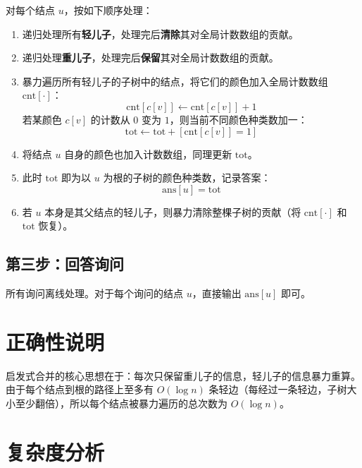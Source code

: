 \documentclass[11pt,a4paper,twocolumn]{ctexart}  %
\begin{document}
对每个结点 $u$，按如下顺序处理：

\begin{enumerate}
    \item 递归处理所有\textbf{轻儿子}，处理完后\textbf{清除}其对全局计数数组的贡献。
    \item 递归处理\textbf{重儿子}，处理完后\textbf{保留}其对全局计数数组的贡献。
    \item 暴力遍历所有轻儿子的子树中的结点，将它们的颜色加入全局计数数组 $\mathrm{cnt}[\cdot]$：
    \[
        \mathrm{cnt}[c[v]] \leftarrow \mathrm{cnt}[c[v]] + 1
    \]
    若某颜色 $c[v]$ 的计数从 $0$ 变为 $1$，则当前不同颜色种类数加一：
    \[
        \mathrm{tot} \leftarrow \mathrm{tot} + [\mathrm{cnt}[c[v]] = 1]
    \]
    \item 将结点 $u$ 自身的颜色也加入计数数组，同理更新 $\mathrm{tot}$。
    \item 此时 $\mathrm{tot}$ 即为以 $u$ 为根的子树的颜色种类数，记录答案：
    \[
        \mathrm{ans}[u] = \mathrm{tot}
    \]
    \item 若 $u$ 本身是其父结点的轻儿子，则暴力清除整棵子树的贡献（将 $\mathrm{cnt}[\cdot]$ 和 $\mathrm{tot}$ 恢复）。
\end{enumerate}

\subsection*{第三步：回答询问}

所有询问离线处理。对于每个询问的结点 $u$，直接输出 $\mathrm{ans}[u]$ 即可。

\section*{正确性说明}

启发式合并的核心思想在于：每次只保留重儿子的信息，轻儿子的信息暴力重算。由于每个结点到根的路径上至多有 $O(\log n)$ 条轻边（每经过一条轻边，子树大小至少翻倍），所以每个结点被暴力遍历的总次数为 $O(\log n)$。

\section*{复杂度分析}
\end{document}

